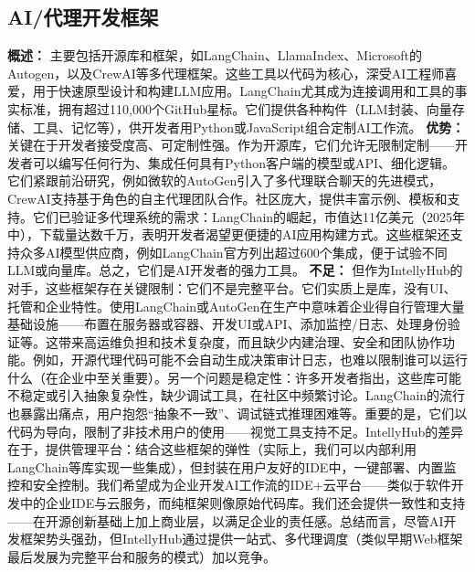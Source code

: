 \documentclass[11点, A4纸, 单面]{article}
\begin{document}
\subsection{AI/代理开发框架}
\textbf{概述：} 主要包括开源库和框架，如LangChain、LlamaIndex、Microsoft的Autogen，以及CrewAI等多代理框架。这些工具以代码为核心，深受AI工程师喜爱，用于快速原型设计和构建LLM应用。LangChain尤其成为连接调用和工具的事实标准，拥有超过110,000个GitHub星标\cite{langchainGitHub}。它们提供各种构件（LLM封装、向量存储、工具、记忆等），供开发者用Python或JavaScript组合定制AI工作流。
\newline\newline
\textbf{优势：} 关键在于开发者接受度高、可定制性强。作为开源库，它们允许无限制定制——开发者可以编写任何行为、集成任何具有Python客户端的模型或API、细化逻辑。它们紧跟前沿研究，例如微软的AutoGen引入了多代理联合聊天的先进模式\cite{autogenGitHub}，CrewAI支持基于角色的自主代理团队合作\cite{crewaiGitHub}。社区庞大，提供丰富示例、模板和支持。它们已验证多代理系统的需求：LangChain的崛起，市值达11亿美元（2025年中），下载量达数千万，表明开发者渴望更便捷的AI应用构建方式。这些框架还支持众多AI模型供应商，例如LangChain官方列出超过600个集成\cite{langchainIntegrations}，便于试验不同LLM或向量库。总之，它们是AI开发者的强力工具。
\newline\newline
\textbf{不足：} 但作为IntellyHub的对手，这些框架存在关键限制：它们不是完整平台。它们实质上是库，没有UI、托管和企业特性。使用LangChain或AutoGen在生产中意味着企业得自行管理大量基础设施——布置在服务器或容器、开发UI或API、添加监控/日志、处理身份验证等。这带来高运维负担和技术复杂度，而且缺少内建治理、安全和团队协作功能。例如，开源代理代码可能不会自动生成决策审计日志，也难以限制谁可以运行什么（在企业中至关重要）。另一个问题是稳定性：许多开发者指出，这些库可能不稳定或引入抽象复杂性，缺少调试工具，在社区中频繁讨论\cite{langchainCritique}。LangChain的流行也暴露出痛点，用户抱怨“抽象不一致”、调试链式推理困难等。重要的是，它们以代码为导向，限制了非技术用户的使用——视觉工具支持不足。IntellyHub的差异在于，提供管理平台：结合这些框架的弹性（实际上，我们可以内部利用LangChain等库实现一些集成），但封装在用户友好的IDE中，一键部署、内置监控和安全控制。我们希望成为企业开发AI工作流的IDE+云平台——类似于软件开发中的企业IDE与云服务，而纯框架则像原始代码库。我们还会提供一致性和支持——在开源创新基础上加上商业层，以满足企业的责任感。总结而言，尽管AI开发框架势头强劲，但IntellyHub通过提供一站式、多代理调度（类似早期Web框架最后发展为完整平台和服务的模式）加以竞争。
\end{document}
